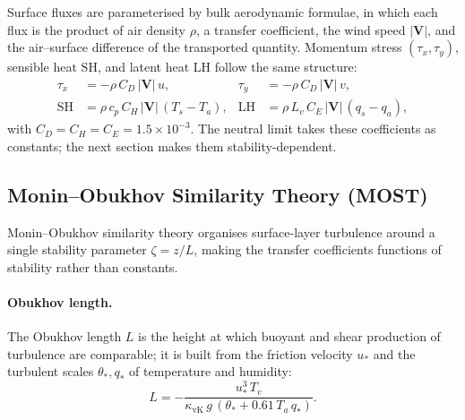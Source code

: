 \documentclass[11pt,twoside]{report}
\newcommand{\cpd}{c_p}
\newcommand{\Lv}{L_v}
\newcommand{\vect}[1]{\bm{#1}}
\begin{document}
Surface fluxes are parameterised by bulk aerodynamic formulae, in which each
flux is the product of air density $\rho$, a transfer coefficient, the wind
speed $|\vect{V}|$, and the air--surface difference of the transported
quantity. Momentum stress $(\tau_x,\tau_y)$, sensible heat $\mathrm{SH}$, and
latent heat $\mathrm{LH}$ follow the same structure:
\begin{align}
  \tau_x &= -\rho\,C_D\,|\vect{V}|\,u, &
  \tau_y &= -\rho\,C_D\,|\vect{V}|\,v, \\
  \mathrm{SH} &= \rho\,\cpd\,C_H\,|\vect{V}|\,(T_s-T_a), &
  \mathrm{LH} &= \rho\,\Lv\,C_E\,|\vect{V}|\,(q_s-q_a),
\end{align}
with $C_D=C_H=C_E=1.5\times10^{-3}$. The neutral limit takes these
coefficients as constants; the next section makes them stability-dependent.

\subsection{Monin--Obukhov Similarity Theory (MOST)}

Monin--Obukhov similarity theory \citep{MoninObukhov1954} organises
surface-layer turbulence around a single stability parameter $\zeta=z/L$,
making the transfer coefficients functions of stability rather than constants.

\paragraph{Obukhov length.}
The Obukhov length $L$ is the height at which buoyant and shear production of
turbulence are comparable; it is built from the friction velocity $u_*$ and
the turbulent scales $\theta_*,q_*$ of temperature and humidity:
\begin{equation}
  L = -\frac{u_*^3\,T_v}
  {\kappa_{\mathrm{vK}}\,g\,(\theta_*+0.61\,T_a\,q_*)}.
\end{equation}
\end{document}
